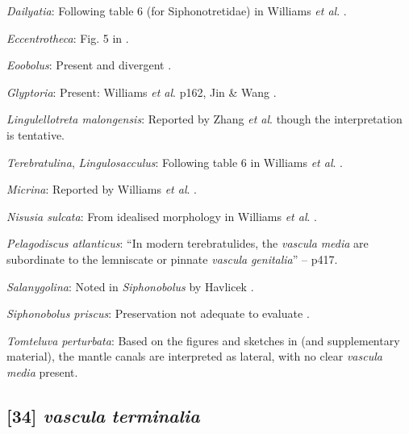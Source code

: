 \documentclass[openany]{book}
\theoremstyle{definition}
\theoremstyle{definition}
\theoremstyle{definition}
\theoremstyle{remark}
\begin{document}
\hypertarget{Dailyatia-coding-33}{}
\emph{Dailyatia}: Following table 6 (for Siphonotretidae) in Williams
\emph{et al}. \citeyearpar{Williams2000LinguliformeaCraniiformea}.

\hypertarget{Eccentrotheca-coding-33}{}
\emph{Eccentrotheca}: Fig. 5 in \citet{Balthasar2009Thebrachiopod}.

\hypertarget{Eoobolus-coding-33}{}
\emph{Eoobolus}: Present and divergent
\citep{Williams2000LinguliformeaCraniiformea}.

\hypertarget{Glyptoria-coding-33}{}
\emph{Glyptoria}: Present: Williams \emph{et al}.
\citeyearpar{Williams2000LinguliformeaCraniiformea} p162, Jin \& Wang
\citeyearpar{Jin1992Revisionof}.

\hypertarget{Lingulellotreta_malongensis-coding-33}{}
\emph{Lingulellotreta malongensis}: Reported by Zhang \emph{et al}.
\citeyearpar{Zhang2007Agregarious} though the interpretation is
tentative.

\hypertarget{Lingulosacculus-coding-33}{}
\emph{Terebratulina}, \emph{Lingulosacculus}: Following table 6 in
Williams \emph{et al}.
\citeyearpar{Williams2000LinguliformeaCraniiformea}.

\hypertarget{Micrina-coding-33}{}
\emph{Micrina}: Reported by Williams \emph{et al}.
\citeyearpar{Williams1998Thediversity}.

\hypertarget{Nisusia_sulcata-coding-33}{}
\emph{Nisusia sulcata}: From idealised morphology in Williams \emph{et
al}. \citeyearpar{Williams2000LinguliformeaCraniiformea}.

\hypertarget{Pelagodiscus_atlanticus-coding-33}{}
\emph{Pelagodiscus atlanticus}: ``In modern terebratulides, the
\emph{vascula} \emph{media} are subordinate to the lemniscate or pinnate
\emph{vascula} \emph{genitalia}'' -- \citet{Williams1997Introduction}
p417.

\hypertarget{Salanygolina-coding-33}{}
\emph{Salanygolina}: Noted in \emph{Siphonobolus} by Havlicek
\citeyearpar{Havlicek1982LingulaceaPaterinacea}.

\hypertarget{Siphonobolus_priscus-coding-33}{}
\emph{Siphonobolus priscus}: Preservation not adequate to evaluate
\citep{Streng2016Anew}.

\hypertarget{Tomteluva_perturbata-coding-33}{}
\emph{Tomteluva perturbata}: Based on the figures and sketches in
\citet{Zhang2014Anearly} (and supplementary material), the mantle canals
are interpreted as lateral, with no clear \emph{vascula} \emph{media}
present.

\subsection*{\texorpdfstring{{[}34{]} \emph{vascula}
\emph{terminalia}}{{[}34{]} vascula terminalia}}\label{vascula-terminalia}
\end{document}
